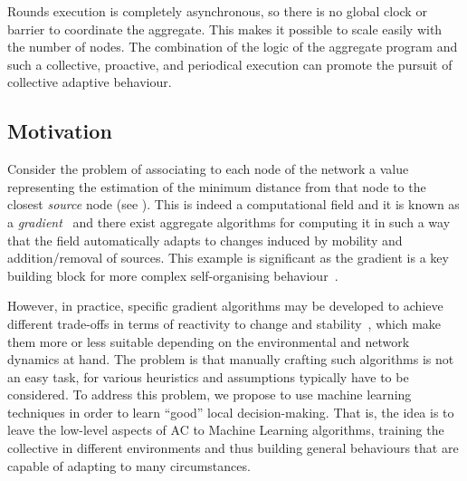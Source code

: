 \documentclass[conference]{IEEEtran}
\begin{document}
Rounds execution is completely asynchronous, so there is no global clock or barrier to coordinate the aggregate. 
%
 This makes it possible to scale easily with the number of nodes. 
%
The combination of the logic of the aggregate program
 and 
 such a collective, proactive, and periodical execution
 can promote the pursuit of collective adaptive behaviour.

\subsection{Motivation}

Consider the problem of associating
 to each node of the network
 a value
 representing the estimation of the minimum distance
 from that node to the closest \emph{source} node (see ).
%
This is indeed a computational field 
 and it is known as a \emph{gradient}~\cite{DBLP:conf/saso/AudritoCDV17}
 and there exist aggregate algorithms
 for computing it in such a way that
 the field automatically adapts 
 to changes induced by mobility
  and addition/removal of sources.
%
This example is significant as the gradient is a key building block 
 for more complex self-organising behaviour~\cite{DBLP:journals/jlap/ViroliBDACP19}.

However, in practice, 
 specific gradient algorithms
 may be developed
 to achieve different trade-offs 
 in terms of reactivity to change and stability~\cite{DBLP:conf/saso/AudritoCDV17},
 which make them more or less suitable depending on 
 the environmental and network dynamics at hand.
%
The problem is that manually crafting such algorithms
 is not an easy task, for various heuristics and assumptions typically have to be considered.
%
To address this problem,
 we propose to use machine learning techniques
 in order to learn ``good'' local decision-making.
% 
That is, the idea is to leave the low-level aspects of AC to Machine Learning algorithms, 
 training the collective in different environments and thus building general behaviours that are capable of adapting to many circumstances.
\end{document}
